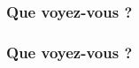 \begin{frame}
  \frametitle{Que voyez-vous ?}
  \begin{minipage}[l]{0.49\linewidth}
  \end{minipage}\hfill
  \begin{minipage}[l]{0.49\linewidth}
  \end{minipage}\hfill
\end{frame}

\begin{frame}
  \frametitle{Que voyez-vous ?}
\end{frame}

